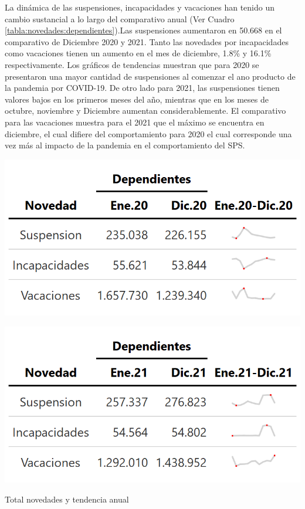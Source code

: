 La dinámica de las suspensiones, incapacidades y vacaciones han tenido un cambio sustancial a lo largo del comparativo anual (Ver Cuadro \ref{tabla:novedades:dependientes}).Las suspensiones aumentaron en 50.668 en el comparativo de Diciembre 2020 y 2021. Tanto las novedades por incapacidades como vacaciones tienen un aumento en el mes de diciembre, 1.8\% y 16.1\% respectivamente. Los gráficos de tendencias muestran que para 2020 se presentaron una mayor cantidad de suspensiones al comenzar el ano producto de la pandemia por COVID-19. De otro lado para 2021, las suspensiones tienen valores bajos en los primeros meses del año, mientras que en los meses de octubre, noviembre y Diciembre aumentan considerablemente. El comparativo para las vacaciones muestra para el 2021 que el máximo se encuentra en diciembre, el cual difiere del comportamiento para 2020 el cual corresponde una vez más al impacto de la pandemia en el comportamiento del SPS.


\begin{table}[!h]
\centering
\begin{minipage}{0.5\textwidth}
  \centering
  \includegraphics[width=\linewidth]{results/01_dinamica/salida_dependientes_novedades_resto_comparativo.png}
\end{minipage}%
\begin{minipage}{0.5\textwidth}
  \centering
  \includegraphics[width=\linewidth]{results/01_dinamica/salida_dependientes_novedades_resto.png}
\end{minipage}
\caption{Total novedades y tendencia anual}
\label{tabla:novedades:dependientes}
\end{table}

